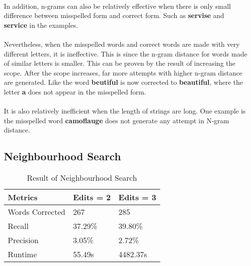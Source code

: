 \documentclass[11pt]{article}
\begin{document}
      \paragraph{}
      In addition, n-grams can also be relatively effective when there is only
      small difference between misspelled form and correct form. Such as
      \textbf{servise} and \textbf{service} in the examples.
      \paragraph{}
      Nevertheless, when the misspelled words and correct words are made with
      very different letters, it is ineffective. This is since the n-gram distance
      for words made of similar letters is smaller. This can be proven by the
      result of increasing the scope. After the scope increases, far more attempts
      with higher n-gram distance are generated. Like the word \textbf{beutiful}
      is now corrected to \textbf{beautiful}, where the letter \textbf{a} does not
      appear in the misspelled form.
      \paragraph{}
      It is also relatively inefficient when the length of strings are long.
      One example is the misspelled word \textbf{camoflauge} does not generate
      any attempt in N-gram distance.

  \subsection{Neighbourhood Search}
    \begin{table}[h]
      \begin{center}
        \begin{tabular}{|l|l|l|}
          \hline
          Metrics & Edits = 2 & Edits = 3\\
          \hline\hline
          Words Corrected & 267 & 285\\
          \hline
          Recall & 37.29\% & 39.80\% \\
          \hline
          Precision & 3.05\% & 2.72\% \\
          \hline
          Runtime & 55.49s & 4482.37s\\
          \hline
        \end{tabular}
        \caption{Result of Neighbourhood Search}\label{table5}
      \end{center}
    \end{table}
\end{document}
